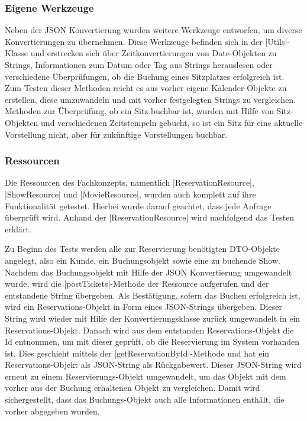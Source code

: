 \subsubsection{Eigene Werkzeuge}

Neben der \acs{JSON} Konvertierung wurden weitere Werkzeuge entworfen, um diverse Konvertierungen zu übernehmen.
Diese Werkzeuge befinden sich in der \jinline |Utils|-Klasse und erstrecken sich über Zeitkonvertierungen von Date-Objekten zu Strings, Informationen zum Datum oder Tag aus Strings herauslesen oder verschiedene Überprüfungen, ob die Buchung eines Sitzplatzes erfolgreich ist.
Zum Testen dieser Methoden reicht es aus vorher eigene Kalender-Objekte zu erstellen, diese umzuwandeln und mit vorher festgelegten Strings zu vergleichen.
Methoden zur Überprüfung, ob ein Sitz buchbar ist, wurden mit Hilfe von Sitz-Objekten und verschiedenen Zeitstempeln gebucht, so ist ein Sitz für eine aktuelle Vorstellung nicht, aber für zukünftige Vorstellungen buchbar.

\subsubsection{Ressourcen}
Die Ressourcen des Fachkonzepts, namentlich \jinline|ReservationResource|, \jinline|ShowResource| und \jinline|MovieResource|, wurden auch komplett auf ihre Funktionalität getestet.
Hierbei wurde darauf geachtet, dass jede Anfrage überprüft wird. Anhand der \jinline |ReservationResource| wird nachfolgend das Testen erklärt.

Zu Beginn des Tests werden alle zur Reservierung benötigten \acs{DTO}-Objekte angelegt, also ein Kunde, ein Buchungsobjekt sowie eine zu buchende Show.
Nachdem das Buchungsobjekt mit Hilfe der \acs{JSON} Konvertierung umgewandelt wurde, wird die \jinline |postTickets|-Methode der Ressource aufgerufen und der entstandene String übergeben.
Als Bestätigung, sofern das Buchen erfolgreich ist, wird ein Reservations-Objekt in Form eines \acs{JSON}-Strings übergeben. Dieser String wird wieder mit Hilfe der Konvertierungsklasse zurück umgewandelt in ein Reservations-Objekt.
Danach wird aus dem entstanden Reservations-Objekt die Id entnommen, um mit dieser geprüft, ob die Reservierung im System vorhanden ist. Dies geschieht mittels der \jinline |getReservationById|-Methode und hat ein Reservations-Objekt als \acs{JSON}-String als Rückgabewert.
Dieser \acs{JSON}-String wird erneut zu einem Reservierungs-Objekt umgewandelt, um das Objekt mit dem vorher aus der Buchung erhaltenen Objekt zu vergleichen. Damit wird sichergestellt, dass das Buchungs-Objekt auch alle Informationen enthält, die vorher abgegeben wurden.

